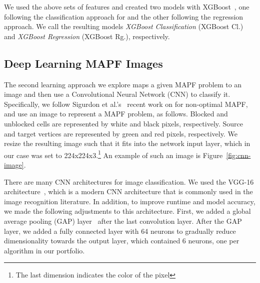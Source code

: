 \documentclass[letterpaper]{article} %
\newcommand\Roni[1]{\nb{\textbf{Roni:}}{red}{#1}}
\begin{document}
We used the above sets of features and created two \AS models with XGBoost~\cite{chen2016xgboost}, one following the classification approach for \AS and the other following the regression approach. We call the resulting \AS models 
\emph{XGBoost Classification} (XGBoost Cl.) and
\emph{XGBoost Regression} (XGBoost Rg.), respectively. 




\subsection{Deep Learning MAPF Images}


The second learning approach we explore 
maps a given MAPF problem to an image and then use a Convolutional Neural Network (CNN) to classify it. 
Specifically, we follow Sigurdon et al.'s~\cite{sigurdson2019deep} recent work on \AS for non-optimal MAPF, and use an image to represent a MAPF problem, as follows. 
Blocked and unblocked cells are represented by white and black pixels, respectively. 
Source and target vertices are represented by green and red pixels, respectively.
We resize the resulting image such that it fits into the network input layer, which in our case was set to 224x224x3.\footnote{The last dimension indicates the color of the pixel} An example of such an image is Figure~\ref{fig:cnn-image}. 



There are many CNN architectures for image classification. 
We used the VGG-16 architecture~\cite{simonyan2014very}, which is a modern CNN architecture that is commonly used in the image recognition literature.  %
In addition, to improve runtime and model accuracy, we made the following adjustments to this architecture. 
First, we added a global average pooling (GAP) layer~\cite{lin2013network} after the last convolution layer. 
After the GAP layer, we added a fully connected layer with 64 neurons to gradually reduce dimensionality towards the output layer, which contained 6 neurons, one per algorithm in our portfolio. 
\end{document}
